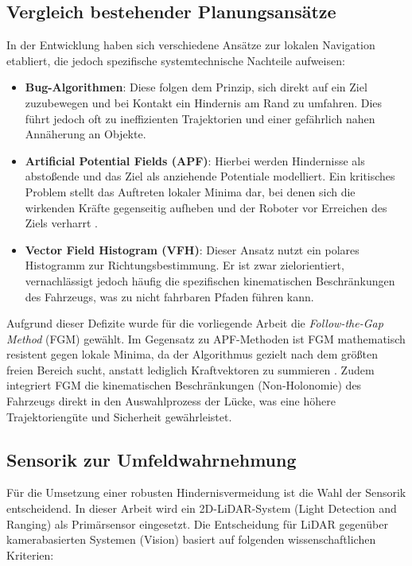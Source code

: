 \subsection{Vergleich bestehender Planungsansätze}

In der Entwicklung haben sich verschiedene Ansätze zur lokalen Navigation etabliert, die jedoch spezifische systemtechnische Nachteile aufweisen:

\begin{itemize}
    \item \textbf{Bug-Algorithmen}: Diese folgen dem Prinzip, sich direkt auf ein Ziel zuzubewegen und bei Kontakt ein Hindernis am Rand zu umfahren. Dies führt jedoch oft zu ineffizienten Trajektorien und einer gefährlich nahen Annäherung an Objekte.
    \item \textbf{Artificial Potential Fields (APF)}: Hierbei werden Hindernisse als abstoßende und das Ziel als anziehende Potentiale modelliert. Ein kritisches Problem stellt das Auftreten lokaler Minima dar, bei denen sich die wirkenden Kräfte gegenseitig aufheben und der Roboter vor Erreichen des Ziels verharrt \cite{sezer2012}.
    \item \textbf{Vector Field Histogram (VFH)}: Dieser Ansatz nutzt ein polares Histogramm zur Richtungsbestimmung. Er ist zwar zielorientiert, vernachlässigt jedoch häufig die spezifischen kinematischen Beschränkungen des Fahrzeugs, was zu nicht fahrbaren Pfaden führen kann.
\end{itemize}

Aufgrund dieser Defizite wurde für die vorliegende Arbeit die \textit{Follow-the-Gap Method} (FGM) gewählt. Im Gegensatz zu APF-Methoden ist FGM mathematisch resistent gegen lokale Minima, da der Algorithmus gezielt nach dem größten freien Bereich sucht, anstatt lediglich Kraftvektoren zu summieren \cite{sezer2012}. Zudem integriert FGM die kinematischen Beschränkungen (Non-Holonomie) des Fahrzeugs direkt in den Auswahlprozess der Lücke, was eine höhere Trajektoriengüte und Sicherheit gewährleistet.

\subsection{Sensorik zur Umfeldwahrnehmung}

Für die Umsetzung einer robusten Hindernisvermeidung ist die Wahl der Sensorik entscheidend. In dieser Arbeit wird ein 2D-LiDAR-System (Light Detection and Ranging) als Primärsensor eingesetzt. Die Entscheidung für LiDAR gegenüber kamerabasierten Systemen (Vision) basiert auf folgenden wissenschaftlichen Kriterien:

